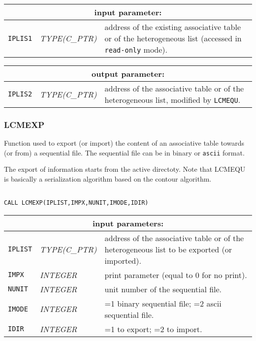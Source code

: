 \noindent
\begin{tabular}{|p{1.5cm}|p{3cm}|p{10cm}|}
\hline
\multicolumn{3}{|c|}{\bf input parameter:} \\
\hline
{\tt IPLIS1} & {\it TYPE(C\_PTR)} & address of the existing associative table or of the heterogeneous list
                                    (accessed in {\tt read-only} mode). \\
\hline
\end{tabular}

\vskip 0.8cm

\noindent
\begin{tabular}{|p{1.5cm}|p{3cm}|p{10cm}|}
\hline
\multicolumn{3}{|c|}{\bf output parameter:} \\
\hline
{\tt IPLIS2} & {\it TYPE(C\_PTR)} & address of the associative table or of the heterogeneous list, modified by {\tt LCMEQU}. \\
\hline
\end{tabular}

\subsubsection{LCMEXP}

Function used to export (or import) the content of an associative table towards (or from) a sequential file. The sequential file
can be in binary or {\tt ascii} format.

\vskip 0.4cm

The export of information starts from the active directoty. Note that {LCMEQU} is basically a serialization algorithm
based on the contour algorithm.

\begin{verbatim}

CALL LCMEXP(IPLIST,IMPX,NUNIT,IMODE,IDIR)
\end{verbatim}

\noindent
\begin{tabular}{|p{1.5cm}|p{3cm}|p{10cm}|}
\hline
\multicolumn{3}{|c|}{\bf input parameters:} \\
\hline
{\tt IPLIST} & {\it TYPE(C\_PTR)} & address of the associative table or of the heterogeneous list to be exported (or imported). \\
\hline
{\tt IMPX} & {\it INTEGER} & print parameter (equal to 0 for no print). \\
\hline
{\tt NUNIT} & {\it INTEGER} & unit number of the sequential file. \\
\hline
{\tt IMODE} & {\it INTEGER} & =1 binary sequential file; 
                                    =2 {\sc ascii} sequential file. \\
\hline
{\tt IDIR} & {\it INTEGER} & =1 to export; =2 to import. \\
\hline
\end{tabular}


